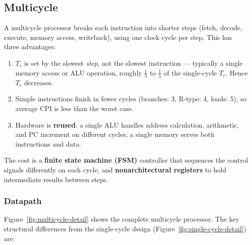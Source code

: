 \documentclass[9pt, a4paper]{extarticle}
\begin{document}
\subsection{Multicycle}

A multicycle processor breaks each instruction into shorter steps (fetch, decode, execute, memory access, writeback), using one clock cycle per step. This has three advantages:

\begin{enumerate}
    \item $T_c$ is set by the slowest \emph{step}, not the slowest instruction --- typically a single memory access or ALU operation, roughly $\frac{1}{3}$ to $\frac{1}{5}$ of the single-cycle $T_c$. Hence $T_c$ decreases.
    \item Simple instructions finish in fewer cycles (branches: 3, R-type: 4, loads: 5), so average CPI is less than the worst case.
    \item Hardware is \textbf{reused}: a single ALU handles address calculation, arithmetic, and PC increment on different cycles; a single memory serves both instructions and data.
\end{enumerate}

The cost is a \textbf{finite state machine (FSM)} controller that sequences the control signals differently on each cycle, and \textbf{nonarchitectural registers} to hold intermediate results between steps.

\subsubsection{Datapath} Figure~\ref{fig:multicycle-detail} shows the complete multicycle processor. The key structural differences from the single-cycle design (Figure~\ref{fig:single-cycle-detail}) are:
\end{document}
